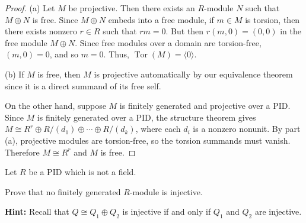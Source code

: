 \documentclass[addpoints,10pt]{exam}
\theoremstyle{plain}
\theoremstyle{definition}
\newtheorem{prob}[thm]{Problem}
\theoremstyle{plain}
\theoremstyle{plain}
\theoremstyle{definition}
\let\oldprob\prob
\let\endoldprob\endprob
\renewenvironment{prob}
  {\begin{singlespace}\oldprob}
  {\endoldprob\end{singlespace}}
\newcommand{\Tor}{\ensuremath{\operatorname{Tor}}}
\begin{document}
\begin{proof}
(a)
Let $M$ be projective. Then there exists an $R$-module $N$ such that
$M\oplus N$ is free. Since $M\oplus N$ embeds into a free module, if
$m\in M$ is torsion, then there exists nonzero $r\in R$ such that
$rm=0$. But then $r(m,0)=(0,0)$ in the free module $M\oplus N$. Since
free modules over a domain are torsion-free, $(m,0)=0$, and so $m=0$.
Thus, $\Tor(M)=\langle 0\rangle$.

(b)
If $M$ is free, then $M$ is projective automatically by our equivalence theorem since it is a direct summand of its free self.

On the other hand, suppose $M$ is finitely generated and projective over a PID.
Since $M$ is finitely generated over a PID, the structure theorem gives
$M\cong R^r\oplus R/(d_1)\oplus\cdots\oplus R/(d_k)$, where each
$d_i$ is a nonzero nonunit. By part (a), projective modules are
torsion-free, so the torsion summands must vanish. Therefore
$M\cong R^r$ and $M$ is free.

\end{proof}


\newpage

\begin{prob}
Let $R$ be a PID which is not a field.

Prove that no finitely generated $R$-module is injective.

\textbf{Hint:} Recall that $Q\cong Q_1\oplus Q_2$ is injective if and only if $Q_1$ and $Q_2$ are injective.
\end{prob}
\end{document}
